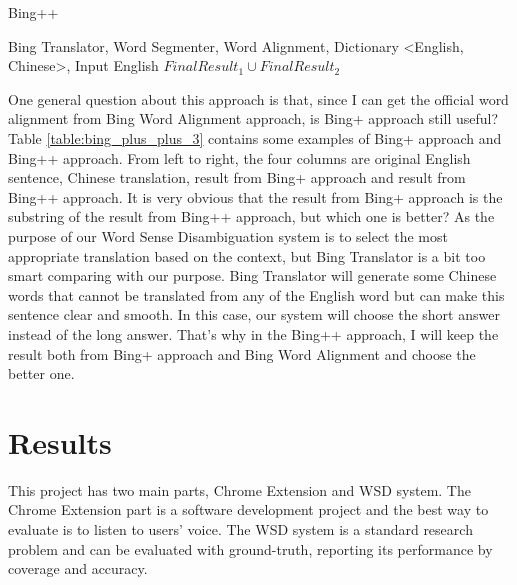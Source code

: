 \documentclass[11pt]{article}
\begin{document}
\begin{algorithm}[ht]
\caption{Bing++}
\label{algorithm:wsd_5}
\begin{algorithmic}
\REQUIRE Bing Translator, Word Segmenter, Word Alignment, Dictionary \textless English, Chinese\textgreater, Input English
        \ENDIF
    \ENDFOR
        \ENDIF
    \ENDFOR
        \ENDIF
    \ENDFOR
\ENDIF
\RETURN $FinalResult_1 \cup FinalResult_2$
\end{algorithmic}
\end{algorithm}
One general question about this approach is that, since I can get the official word alignment from Bing Word Alignment approach, is Bing+ approach still useful? Table \ref{table:bing_plus_plus_3} contains some examples of Bing+ approach and Bing++ approach. From left to right, the four columns are original English sentence, Chinese translation, result from Bing+ approach and result from Bing++ approach. It is very obvious that the result from Bing+ approach is the substring of the result from Bing++ approach, but which one is better? As the purpose of our Word Sense Disambiguation system is to select the most appropriate translation based on the context, but Bing Translator is a bit too smart comparing with our purpose. Bing Translator will generate some Chinese words that cannot be translated from any of the English word but can make this sentence clear and smooth. In this case, our system will choose the short answer instead of the long answer. That's why in the Bing++ approach, I will keep the result both from Bing+ approach and Bing Word Alignment and choose the better one.
\\
\section{Results}
This project has two main parts, Chrome Extension and WSD system. The Chrome Extension part is a  software development project and the best way to evaluate is to listen to users' voice. The WSD system is a standard research problem and can be evaluated with ground-truth, reporting its performance
by coverage and accuracy.
\end{document}
